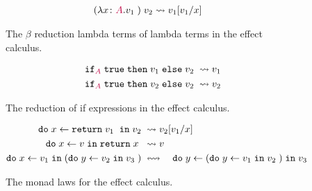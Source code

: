 \begin{figure}
    \begin{framed}
        \begin{align*}
            \apply{(\lam{x}{A}{v_1})}{v_2} & \rightsquigarrow v_1\ssub{x}{v_1}
        \end{align*}
    \end{framed}
    \caption{The $\beta$ reduction lambda terms of lambda terms in the effect calculus.}
    \label{ECBeta}
\end{figure}

\begin{figure}
    \begin{framed}
        \begin{align*}
            \pifthenelse{A}{\t}{v_1}{v_2} & \rightsquigarrow v_1\\
            \pifthenelse{A}{\t}{v_2}{v_2} & \rightsquigarrow v_2\\
        \end{align*}
    \end{framed}
    \caption{The reduction of if expressions in the effect calculus.}
    \label{ECIf}
\end{figure}


\begin{figure}
    \begin{framed}
        \begin{align*}
            \doin{x}{\return{v_1}}{v_2} & \rightsquigarrow v_2\ssub{x}{v_1}\\
            \doin{x}{v}{\return{x}} & \rightsquigarrow v\\
            \doin{x}{v_1}{(\doin{y}{v_2}{v_3})} 
            & \leftrightsquigarrow\quad  \doin{y}{(\doin{y}{v_1}{v_2})}{v_3}
        \end{align*}
    \end{framed}
    \caption{The monad laws for the effect calculus.}
    \label{ECMonads}
\end{figure}





